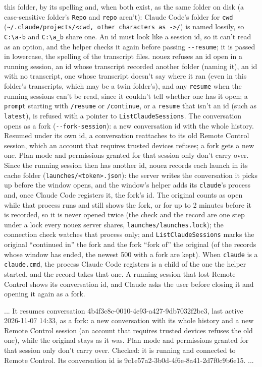 \documentclass[10pt,a4paper]{article}
\newcommand{\code}[1]{\texttt{#1}}
\begin{document}
this folder, by its spelling and, when both exist, as the same folder on disk (a case-sensitive
folder's \code{Repo} and \code{repo} aren't): Claude Code's folder for \code{cwd}
(\code{\textasciitilde/.claude/projects/<cwd, other characters as ->/}) is named lossily, so
\code{C:\textbackslash{}a-b} and \code{C:\textbackslash{}a\_b} share one. An id must look like a session id, so it can't read as an option, and the helper
checks it again before passing \code{-{}-resume}; it is passed in lowercase, the spelling of the
transcript files. nouez refuses an id open in a running session, an id
whose transcript recorded another folder (naming it), an id with no transcript, one whose transcript
doesn't say where it ran (even in this folder's transcripts, which may be a twin folder's), and any \code{resume}
when the running sessions can't be read, since it couldn't tell whether one has it open; a \code{prompt}
starting with \code{/resume} or \code{/continue}, or a \code{resume} that isn't an id (such as
\code{latest}), is refused with a pointer to \code{ListClaudeSessions}.
The conversation opens as a fork (\code{-{}-fork-session}): a new conversation id with the whole
history. Resumed under its own id, a conversation reattaches to its old Remote Control session,
which an account that requires trusted devices refuses; a fork gets a new one. Plan mode and
permissions granted for that session only don't carry over. Since the running session then has
another id, nouez records each launch in its cache folder (\code{launches/<token>.json}): the server
writes the conversation it picks up before the window opens, and the window's helper adds its
\code{claude}'s process and, once Claude Code registers it, the fork's id. The original counts as
open while that process runs and still shows the fork, or for up to 2 minutes before it is
recorded, so it is never opened twice (the check and the record are one step under a lock every
nouez server shares, \code{launches/launches.lock}); the connection check watches that process only; and \code{ListClaudeSessions} marks the
original ``continued in'' the fork and the fork ``fork of'' the original (of the records whose window
has ended, the newest 500 with a fork are kept). When \code{claude} is a \code{claude.cmd}, the process
Claude Code registers is a child of the one the helper started, and the record takes that one. A running session that lost Remote Control shows its conversation id, and
Claude asks the user before closing it and opening it again as a fork.
\begin{plain}
... It resumes conversation 4b4f3c8c-0010-4e93-a427-9db7032f2be3, last active 2026-11-07 14:33, as a fork: a new conversation with its whole history and a new Remote Control session (an account that requires trusted devices refuses the old one), while the original stays as it was. Plan mode and permissions granted for that session only don't carry over. Checked: it is running and connected to Remote Control. Its conversation id is 9c1e57a2-3b0d-4f6e-8a41-2d7f0c9b6e15. ...
\end{plain}
\end{document}

